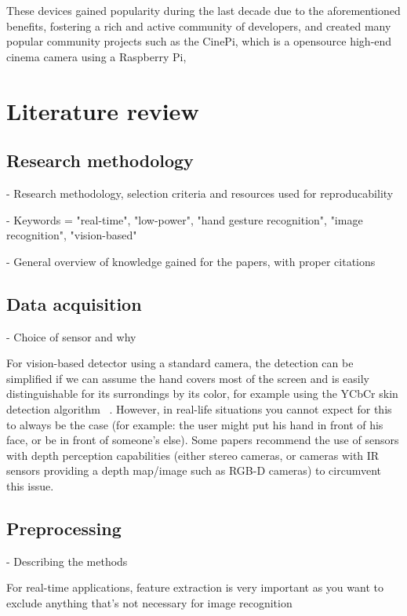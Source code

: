 \documentclass[12pt]{article}
\begin{document}
These devices gained popularity during the last decade due to the aforementioned benefits, fostering a rich and active community of developers, and created many popular community projects such as the CinePi, which is a opensource high-end cinema camera using a Raspberry Pi, %

\section{Literature review}

 \subsection{Research methodology}

 - Research methodology, selection criteria and resources used for reproducability

 - Keywords = "real-time", "low-power", "hand gesture recognition", "image recognition", "vision-based"

 - General overview of knowledge gained for the papers, with proper citations

 \subsection{Data acquisition}

 - Choice of sensor and why

 For vision-based detector using a standard camera, the detection can be simplified if we can assume the hand covers most of the screen and is easily distinguishable for its surrondings by its color, for example using the YCbCr skin detection algorithm ~\cite{AIBINU20121183}.
 However, in real-life situations you cannot expect for this to always be the case (for example: the user might put his hand in front of his face, or be in front of someone's else).
 Some papers recommend the use of sensors with depth perception capabilities (either stereo cameras, or cameras with IR sensors providing a depth map/image such as RGB-D cameras) to circumvent this issue. ~\cite{sahoo2022real}

 \subsection{Preprocessing}

 - Describing the methods

 For real-time applications, feature extraction is very important as you want to exclude anything that's not necessary for image recognition
\end{document}
